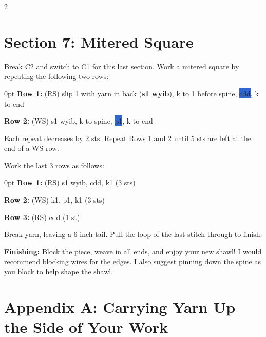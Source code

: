 \documentclass[12pt]{article}
\newcommand{\rowDir}[1]{\hspace{-2em} \textbf{#1:}} %
\newcommand{\spine}[1]{\colorbox{highlight}{#1}} %
\newenvironment{frnote}
    {%
    	\setlength{\FrameRule}{1.5pt}
    	\def\FrameCommand{\fboxrule=\FrameRule\fboxsep=\FrameSep \fcolorbox{framecolor}{shadecolor}}
    	\MakeFramed {\FrameRestore}}
    {\setlength{\FrameRule}{1pt}
	\endMakeFramed}
\newenvironment{unframed}
    {%
	\begin{addmargin}[1.5cm]{0pt}}
    {\vspace{1em}
	\end{addmargin}}
\begin{document}
\begin{multicols}{2}
\section*{Section 7: Mitered Square}

Break C2 and switch to C1 for this last section. Work a mitered square by repeating the following two rows:

\begin{unframed}
\rowDir{Row 1} (RS) slip 1 with yarn in back (\textbf{s1 wyib}), k to 1 before spine, \spine{cdd}, k to end

\rowDir{Row 2} (WS) s1 wyib, k to spine, \spine{p1}, k to end
\end{unframed}

Each repeat decreases by 2 sts. Repeat Rows 1 and 2 until 5 sts are left at the end of a WS row. 

Work the last 3 rows as follows:

\begin{unframed}
\rowDir{Row 1} (RS) s1 wyib, cdd, k1 (3 sts)

\rowDir{Row 2} (WS) k1, p1, k1 (3 sts)

\rowDir{Row 3} (RS) cdd (1 st)
\end{unframed}

Break yarn, leaving a 6 inch tail. Pull the loop of the last stitch through to finish. 

\begin{frnote}
\textbf{Finishing:} Block the piece, weave in all ends, and enjoy your new shawl! I would recommend blocking wires for the edges. I also suggest pinning down the spine as you block to help shape the shawl.
\end{frnote}
\end{multicols}

\newpage

\section*{Appendix A: Carrying Yarn Up the Side of Your Work}
\end{document}
